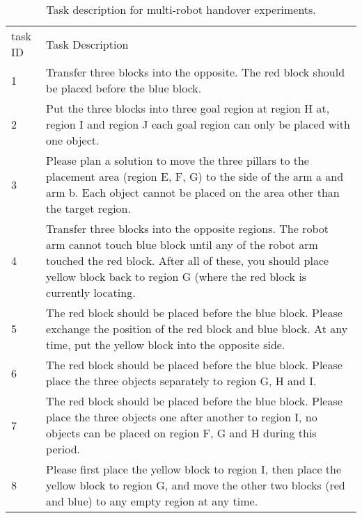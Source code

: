 \documentclass{article}
\begin{document}
\begin{table*}[!t]
    \centering\footnotesize
    \setlength{\tabcolsep}{3pt} %
\begin{tabular}{ll}
task ID & Task Description\\ 
1 & Transfer three blocks into the opposite. The red block should be placed before the blue block. \\
2 & Put the three blocks into three goal region at region H at, region I and region J each goal region can only be placed with one object. \\
3 & Please plan a solution to move the three pillars to the placement area (region E, F, G) to the side of the arm a and arm b. Each object cannot be placed on the area other than the target region. \\
4 & Transfer three blocks into the opposite regions. The robot arm cannot touch blue block until any of the robot arm touched the red block. After all of these, you should place yellow block back to region G (where the red block is currently locating. \\
5 & The red block should be placed before the blue block. Please exchange the position of the red block and blue block. At any time, put the yellow block into the opposite side. \\
6 & The red block should be placed before the blue block.  Please place the three objects separately to region G, H and I. \\
7 & The red block should be placed before the blue block. Please place the three objects one after another to region I, no objects can be placed on region F, G and H during this period. \\
8 & Please first place the yellow block to region I, then place the yellow block to region G, and move the other two blocks (red and blue) to any empty region at any time. \\
\end{tabular}
    \caption{Task description for multi-robot handover experiments.}
    \label{tab:tableset}
    \vspace{-10pt}
\end{table*}
\end{document}
